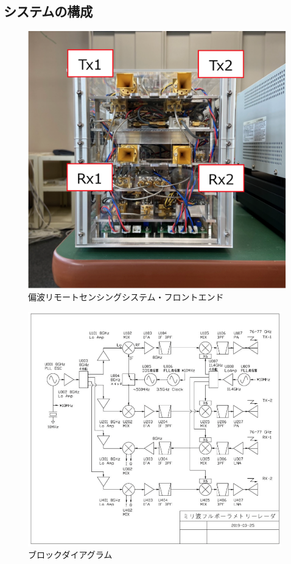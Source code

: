 \documentclass[uplatex,a4paper,10pt]{jsarticle}
\begin{document}
\subsection{システムの構成}
\begin{figure}[hbtp]
	\centering
	\includegraphics[scale=0.3]{../img/system.png}
    \caption{偏波リモートセンシングシステム・フロントエンド}
	\label{fig:system}
\end{figure}
\begin{figure}[hbtp]
	\centering
	\includegraphics[width=110mm]{../img/diagram.png}
    \caption{ブロックダイアグラム}
	\label{fig:diagram}
\end{figure}
\end{document}
